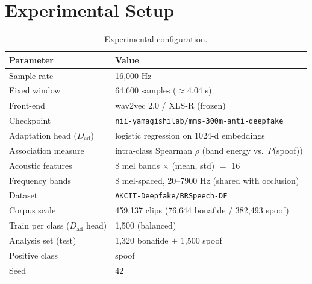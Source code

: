 \documentclass[sigconf]{acmart}
\begin{document}
\section{Experimental Setup}
\begin{table}[t]
  \caption{Experimental configuration.}
  \label{tab:config}
  \begin{tabular}{ll}
    \toprule
    Parameter & Value \\
    \midrule
    Sample rate & 16{,}000 Hz \\
    Fixed window & 64{,}600 samples ($\approx$4.04 s) \\
    Front-end & wav2vec 2.0 / XLS-R (frozen) \\
    Checkpoint & \texttt{nii-yamagishilab/mms-300m-anti-deepfake} \\
    Adaptation head ($D_\mathrm{ad}$) & logistic regression on 1024-d embeddings \\
    Association measure & intra-class Spearman $\rho$ (band energy vs.\ $P$(spoof)) \\
    Acoustic features & 8 mel bands $\times$ (mean, std) $=$ 16 \\
    Frequency bands & 8 mel-spaced, 20--7900 Hz (shared with occlusion) \\
    Dataset & \texttt{AKCIT-Deepfake/BRSpeech-DF} \\
    Corpus scale & 459{,}137 clips (76{,}644 bonafide / 382{,}493 spoof) \\
    Train per class ($D_\mathrm{ad}$ head) & 1{,}500 (balanced) \\
    Analysis set (test) & 1{,}320 bonafide $+$ 1{,}500 spoof \\
    Positive class & spoof \\
    Seed & 42 \\
    \bottomrule
  \end{tabular}
\end{table}
\end{document}
